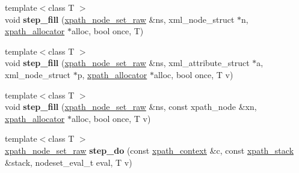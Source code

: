 \begin{DoxyCompactItemize}
\mbox{\label{classxpath__ast__node_acbc4f5ec0e4d48444564d5101890416e}} 
{\footnotesize template$<$class T $>$ }\\void {\bfseries step\+\_\+fill} (\hyperlink{classxpath__node__set__raw}{xpath\+\_\+node\+\_\+set\+\_\+raw} \&ns, xml\+\_\+node\+\_\+struct $\ast$n, \hyperlink{classxpath__allocator}{xpath\+\_\+allocator} $\ast$alloc, bool once, T)
\item 
\mbox{\label{classxpath__ast__node_aca100722d72e30f12c7276e8b2616587}} 
{\footnotesize template$<$class T $>$ }\\void {\bfseries step\+\_\+fill} (\hyperlink{classxpath__node__set__raw}{xpath\+\_\+node\+\_\+set\+\_\+raw} \&ns, xml\+\_\+attribute\+\_\+struct $\ast$a, xml\+\_\+node\+\_\+struct $\ast$p, \hyperlink{classxpath__allocator}{xpath\+\_\+allocator} $\ast$alloc, bool once, T v)
\item 
\mbox{\label{classxpath__ast__node_ad1bf00f367027a353dc253900e85c036}} 
{\footnotesize template$<$class T $>$ }\\void {\bfseries step\+\_\+fill} (\hyperlink{classxpath__node__set__raw}{xpath\+\_\+node\+\_\+set\+\_\+raw} \&ns, const xpath\+\_\+node \&xn, \hyperlink{classxpath__allocator}{xpath\+\_\+allocator} $\ast$alloc, bool once, T v)
\item 
\mbox{\label{classxpath__ast__node_a3258c05ab9aaa78e154d2ff63fe56906}} 
{\footnotesize template$<$class T $>$ }\\\hyperlink{classxpath__node__set__raw}{xpath\+\_\+node\+\_\+set\+\_\+raw} {\bfseries step\+\_\+do} (const \hyperlink{structxpath__context}{xpath\+\_\+context} \&c, const \hyperlink{structxpath__stack}{xpath\+\_\+stack} \&stack, nodeset\+\_\+eval\+\_\+t eval, T v)
\end{DoxyCompactItemize}
